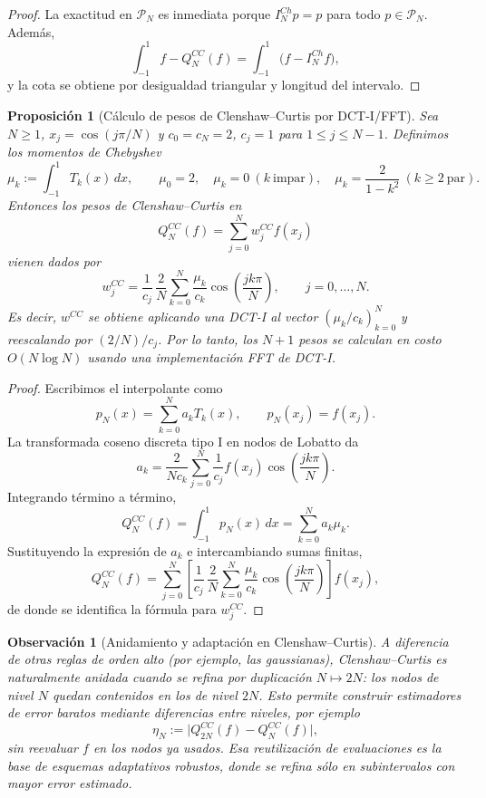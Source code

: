 \documentclass[a4paper,11pt]{report}
\newtheorem{proposition}[theorem]{Proposición}
\newtheorem{remark}[theorem]{Observación}
\begin{document}
\begin{proof}
La exactitud en $\mathcal P_N$ es inmediata porque $I_N^{Ch}p=p$ para todo $p\in\mathcal P_N$. Además,
\[
\int_{-1}^1 f- Q_N^{CC}(f)=\int_{-1}^1\bigl(f-I_N^{Ch}f\bigr),
\]
y la cota se obtiene por desigualdad triangular y longitud del intervalo.
\end{proof}

\begin{proposition}[C\'alculo de pesos de Clenshaw--Curtis por DCT-I/FFT]\label{prop:pesos_cc_dct}
Sea $N\ge1$, $x_j=\cos(j\pi/N)$ y $c_0=c_N=2$, $c_j=1$ para $1\le j\le N-1$. Definimos los momentos de Chebyshev
\[
\mu_k:=\int_{-1}^1 T_k(x)\,dx,
\qquad
\mu_0=2,
\quad
\mu_k=0\ (k\ \text{impar}),
\quad
\mu_k=\frac{2}{1-k^2}\ (k\ge2\ \text{par}).
\]
Entonces los pesos de Clenshaw--Curtis en
\[
Q_N^{CC}(f)=\sum_{j=0}^N w_j^{CC}f(x_j)
\]
vienen dados por
\[
w_j^{CC}=\frac{1}{c_j}\,\frac{2}{N}\sum_{k=0}^N \frac{\mu_k}{c_k}\cos\!\left(\frac{jk\pi}{N}\right),
\qquad j=0,\dots,N.
\]
Es decir, $w^{CC}$ se obtiene aplicando una DCT-I al vector $(\mu_k/c_k)_{k=0}^N$ y reescalando por $(2/N)/c_j$. Por lo tanto, los $N+1$ pesos se calculan en costo $O(N\log N)$ usando una implementación FFT de DCT-I.
\end{proposition}

\begin{proof}
Escribimos el interpolante como
\[
p_N(x)=\sum_{k=0}^N a_kT_k(x),\qquad p_N(x_j)=f(x_j).
\]
La transformada coseno discreta tipo I en nodos de Lobatto da
\[
a_k=\frac{2}{Nc_k}\sum_{j=0}^N\frac{1}{c_j}f(x_j)\cos\!\left(\frac{jk\pi}{N}\right).
\]
Integrando término a término,
\[
Q_N^{CC}(f)=\int_{-1}^1 p_N(x)\,dx=\sum_{k=0}^N a_k\mu_k.
\]
Sustituyendo la expresión de $a_k$ e intercambiando sumas finitas,
\[
Q_N^{CC}(f)=\sum_{j=0}^N\left[\frac{1}{c_j}\,\frac{2}{N}\sum_{k=0}^N\frac{\mu_k}{c_k}\cos\!\left(\frac{jk\pi}{N}\right)\right]f(x_j),
\]
de donde se identifica la fórmula para $w_j^{CC}$.
\end{proof}

\begin{remark}[Anidamiento y adaptación en Clenshaw--Curtis]\label{rem:cc_anidada}
A diferencia de otras reglas de orden alto (por ejemplo, las gaussianas), Clenshaw--Curtis es naturalmente anidada cuando se refina por duplicación $N\mapsto 2N$: los nodos de nivel $N$ quedan contenidos en los de nivel $2N$. Esto permite construir estimadores de error baratos mediante diferencias entre niveles, por ejemplo
\[
\eta_N:=\bigl|Q_{2N}^{CC}(f)-Q_N^{CC}(f)\bigr|,
\]
sin reevaluar $f$ en los nodos ya usados. Esa reutilización de evaluaciones es la base de esquemas adaptativos robustos, donde se refina sólo en subintervalos con mayor error estimado.
\end{remark}
\end{document}

